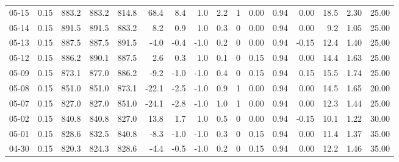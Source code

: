 \begin{threeparttable}
{\begin{tabular}{lrrrrrrrrrrrrrrr}
  05-15 &     0.15 & 883.2 & 883.2 & 814.8 &       68.4 &            8.4 &                      1.0 &                 2.2 &              1 &       0.00 &      0.94 &           0.00 &             18.5 &            2.30 &                  25.00 \\
  05-14 &     0.15 & 891.5 & 891.5 & 883.2 &        8.2 &            0.9 &                      1.0 &                 0.3 &              0 &       0.00 &      0.94 &           0.00 &              9.2 &            1.05 &                  25.00 \\
  05-13 &     0.15 & 887.5 & 887.5 & 891.5 &       -4.0 &           -0.4 &                     -1.0 &                 0.2 &              0 &       0.00 &      0.94 &          -0.15 &             12.4 &            1.40 &                  25.00 \\
  05-12 &     0.15 & 886.2 & 890.1 & 887.5 &        2.6 &            0.3 &                      1.0 &                 0.1 &              0 &       0.15 &      0.94 &           0.00 &             14.4 &            1.63 &                  25.00 \\
  05-09 &     0.15 & 873.1 & 877.0 & 886.2 &       -9.2 &           -1.0 &                     -1.0 &                 0.4 &              0 &       0.15 &      0.94 &           0.15 &             15.5 &            1.74 &                  25.00 \\
  05-08 &     0.15 & 851.0 & 851.0 & 873.1 &      -22.1 &           -2.5 &                     -1.0 &                 0.9 &              1 &       0.00 &      0.94 &           0.00 &             14.5 &            1.65 &                  20.00 \\
  05-07 &     0.15 & 827.0 & 827.0 & 851.0 &      -24.1 &           -2.8 &                     -1.0 &                 1.0 &              1 &       0.00 &      0.94 &           0.00 &             12.3 &            1.44 &                  25.00 \\
  05-02 &     0.15 & 840.8 & 840.8 & 827.0 &       13.8 &            1.7 &                      1.0 &                 0.5 &              0 &       0.00 &      0.94 &          -0.15 &             10.1 &            1.22 &                  30.00 \\
  05-01 &     0.15 & 828.6 & 832.5 & 840.8 &       -8.3 &           -1.0 &                     -1.0 &                 0.3 &              0 &       0.15 &      0.94 &           0.00 &             11.4 &            1.37 &                  35.00 \\
  04-30 &     0.15 & 820.3 & 824.3 & 828.6 &       -4.4 &           -0.5 &                     -1.0 &                 0.2 &              0 &       0.15 &      0.94 &           0.00 &             12.2 &            1.46 &                  35.00 \\

\end{tabular}}
\end{threeparttable}
